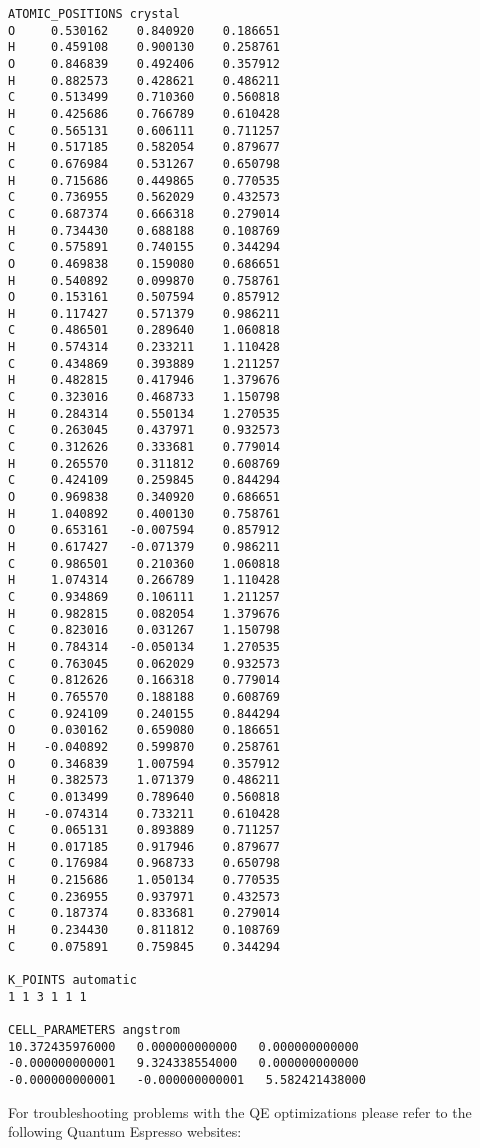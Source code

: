 \documentclass[11pt,letterpaper]{article}
\begin{document}
\begin{spacing}{1.0}
\begin{verbatim}
ATOMIC_POSITIONS crystal
O     0.530162    0.840920    0.186651
H     0.459108    0.900130    0.258761
O     0.846839    0.492406    0.357912
H     0.882573    0.428621    0.486211
C     0.513499    0.710360    0.560818
H     0.425686    0.766789    0.610428
C     0.565131    0.606111    0.711257
H     0.517185    0.582054    0.879677
C     0.676984    0.531267    0.650798
H     0.715686    0.449865    0.770535
C     0.736955    0.562029    0.432573
C     0.687374    0.666318    0.279014
H     0.734430    0.688188    0.108769
C     0.575891    0.740155    0.344294
O     0.469838    0.159080    0.686651
H     0.540892    0.099870    0.758761
O     0.153161    0.507594    0.857912
H     0.117427    0.571379    0.986211
C     0.486501    0.289640    1.060818
H     0.574314    0.233211    1.110428
C     0.434869    0.393889    1.211257
H     0.482815    0.417946    1.379676
C     0.323016    0.468733    1.150798
H     0.284314    0.550134    1.270535
C     0.263045    0.437971    0.932573
C     0.312626    0.333681    0.779014
H     0.265570    0.311812    0.608769
C     0.424109    0.259845    0.844294
O     0.969838    0.340920    0.686651
H     1.040892    0.400130    0.758761
O     0.653161   -0.007594    0.857912
H     0.617427   -0.071379    0.986211
C     0.986501    0.210360    1.060818
H     1.074314    0.266789    1.110428
C     0.934869    0.106111    1.211257
H     0.982815    0.082054    1.379676
C     0.823016    0.031267    1.150798
H     0.784314   -0.050134    1.270535
C     0.763045    0.062029    0.932573
C     0.812626    0.166318    0.779014
H     0.765570    0.188188    0.608769
C     0.924109    0.240155    0.844294
O     0.030162    0.659080    0.186651
H    -0.040892    0.599870    0.258761
O     0.346839    1.007594    0.357912
H     0.382573    1.071379    0.486211
C     0.013499    0.789640    0.560818
H    -0.074314    0.733211    0.610428
C     0.065131    0.893889    0.711257
H     0.017185    0.917946    0.879677
C     0.176984    0.968733    0.650798
H     0.215686    1.050134    0.770535
C     0.236955    0.937971    0.432573
C     0.187374    0.833681    0.279014
H     0.234430    0.811812    0.108769
C     0.075891    0.759845    0.344294

K_POINTS automatic
1 1 3 1 1 1

CELL_PARAMETERS angstrom
10.372435976000   0.000000000000   0.000000000000
-0.000000000001   9.324338554000   0.000000000000
-0.000000000001   -0.000000000001   5.582421438000
\end{verbatim}

For troubleshooting problems with the QE optimizations please refer to the following Quantum Espresso websites: 


\end{spacing}
\end{document}
